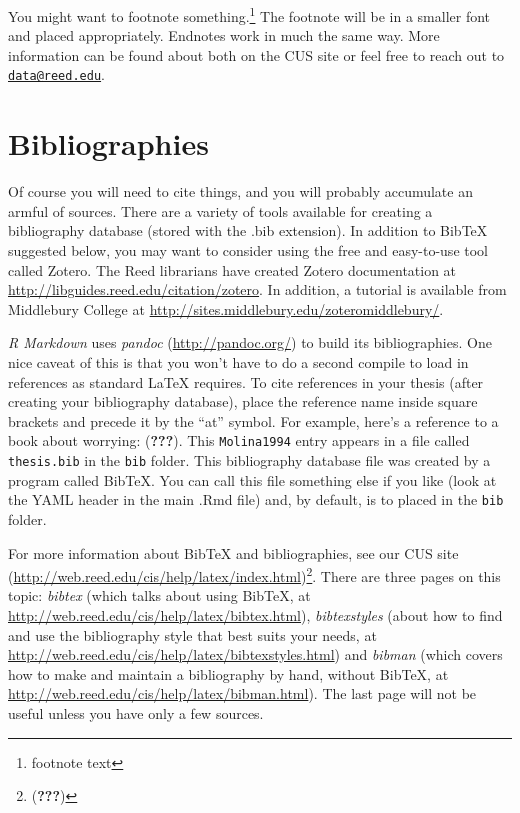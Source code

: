 \documentclass[grad,numbers]{coppe}
\begin{document}
  You might want to footnote something.\footnote{footnote text} The footnote will be in a smaller font and placed appropriately. Endnotes work in much the same way. More information can be found about both on the CUS site or feel free to reach out to \href{mailto:data@reed.edu}{\nolinkurl{data@reed.edu}}.
  
  \hypertarget{bibliographies}{%
  \section{Bibliographies}\label{bibliographies}}
  
  Of course you will need to cite things, and you will probably accumulate an armful of sources. There are a variety of tools available for creating a bibliography database (stored with the .bib extension). In addition to BibTeX suggested below, you may want to consider using the free and easy-to-use tool called Zotero. The Reed librarians have created Zotero documentation at \url{http://libguides.reed.edu/citation/zotero}. In addition, a tutorial is available from Middlebury College at \url{http://sites.middlebury.edu/zoteromiddlebury/}.
  
  \emph{R Markdown} uses \emph{pandoc} (\url{http://pandoc.org/}) to build its bibliographies. One nice caveat of this is that you won't have to do a second compile to load in references as standard LaTeX requires. To cite references in your thesis (after creating your bibliography database), place the reference name inside square brackets and precede it by the ``at'' symbol. For example, here's a reference to a book about worrying: ({\textbf{???}}). This \texttt{Molina1994} entry appears in a file called \texttt{thesis.bib} in the \texttt{bib} folder. This bibliography database file was created by a program called BibTeX. You can call this file something else if you like (look at the YAML header in the main .Rmd file) and, by default, is to placed in the \texttt{bib} folder.
  
  For more information about BibTeX and bibliographies, see our CUS site (\url{http://web.reed.edu/cis/help/latex/index.html})\footnote{({\textbf{???}})}. There are three pages on this topic: \emph{bibtex} (which talks about using BibTeX, at \url{http://web.reed.edu/cis/help/latex/bibtex.html}), \emph{bibtexstyles} (about how to find and use the bibliography style that best suits your needs, at \url{http://web.reed.edu/cis/help/latex/bibtexstyles.html}) and \emph{bibman} (which covers how to make and maintain a bibliography by hand, without BibTeX, at \url{http://web.reed.edu/cis/help/latex/bibman.html}). The last page will not be useful unless you have only a few sources.
  
\end{document}
